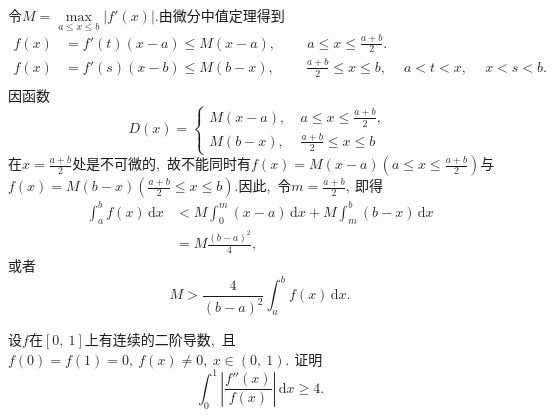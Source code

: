 	\begin{solution}
		令$M=\max\limits_{a\le x\le b}\left|f'(x)\right|.$由微分中值定理得到
		\begin{align*}
			f(x)&=f'(t)(x-a)\le M(x-a),\ \qquad a\le x\le \frac{a+b}{2}.\\
			f(x)&=f'(s)(x-b)\le M(b-x),\ \qquad\frac{a+b}{2}\le x\le b,\ \quad a<t<x,\ \quad x<s<b.\\
		\end{align*}
		因函数
		$$D(x) = \begin{cases}
			M(x-a),\  & a\le x \le \frac{a+b}{2},\  \\
			M(b-x),\  & \frac{a+b}{2}\le x\le b 	
		\end{cases}$$
		在$x=\frac{a+b}{2}$处是不可微的,\ 故不能同时有$f(x)=M(x-a)\left(a\le x\le \frac{a+b}{2}\right)$与$f(x)=M(b-x)\left(\frac{a+b}{2}\le x\le b\right)$.因此,\ 令$m=\frac{a+b}{2},\ $即得
		\begin{align*}
			\int_{a}^{b}f(x)\,\text{d}x&<M\int_{0}^{m}(x-a)\,\text{d}x+M\int_{m}^{b}(b-x)\,\text{d}x\\
			&=M\frac{(b-a)^2}{4},\ 
		\end{align*}
		或者
		$$M>\frac{4}{(b-a)^2}\int_{a}^{b}f(x)\,\text{d}x.$$ 
	\end{solution}
	\newpage
	\begin{problem}
		设$f$在$\left[0,\ 1\right]$上有连续的二阶导数,\ 且$f(0)=f(1)=0,\ f(x)\neq 0,\ x\in\left(0,\ 1\right).$
		证明
		$$\int_{0}^{1}\left|\frac{f''(x)}{f(x)}\right|\,\text{d}x\ge 4.$$
	\end{problem}
	
